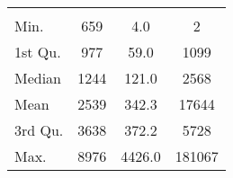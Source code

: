 \begin{tabular}{lS[table-format=5.1]S[table-format=5.1]S[table-format=5.1]}
&  &  &  \\
 Min.    & 659 & 4.0 & 2 \\
 1st Qu. & 977 & 59.0 & 1099 \\
 Median  & 1244 & 121.0 & 2568 \\
 Mean    & 2539 & 342.3 & 17644 \\
 3rd Qu. & 3638 & 372.2 & 5728 \\
 Max.    & 8976 & 4426.0 & 181067 \\
\end{tabular}
